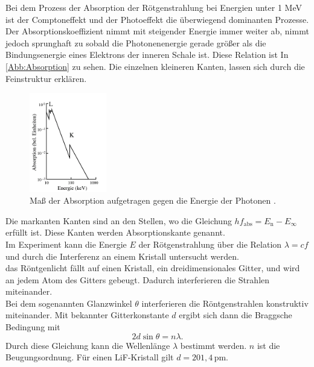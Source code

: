 Bei dem Prozess der Absorption der Rötgenstrahlung bei Energien unter
1 MeV ist der Comptoneffekt und der Photoeffekt die überwiegend dominanten
Prozesse.\\
Der Absorptionskoeffizient nimmt mit steigender Energie immer weiter ab,
nimmt jedoch sprunghaft zu sobald die Photonenenergie gerade größer als die
Bindungsenergie eines Elektrons der inneren Schale ist. Diese Relation ist In
\autoref{Abb:Absorption} zu sehen. Die einzelnen kleineren Kanten, lassen
sich durch die Feinstruktur erklären.\\
\begin{figure}
    \centering
    \includegraphics[width=0.3\textwidth]{Bilder/Absorption.png}
    \caption{Maß der Absorption aufgetragen gegen die Energie der Photonen \cite{sample}.}
    \label{Abb:Absorption}
\end{figure}
Die markanten Kanten sind an den Stellen, wo die Gleichung $h f_{\mathrm{abs}} = E_{\mathrm{n}} - E_{\infty}$
erfüllt ist. Diese Kanten werden Absorptionskante genannt.\\
Im Experiment kann die Energie $E$ der Rötgenstrahlung über die Relation $\lambda = cf$ und
durch die Interferenz an einem Kristall untersucht werden.\\
das Röntgenlicht fällt auf einen Kristall, ein dreidimensionales Gitter,
und wird an jedem Atom des Gitters gebeugt. Dadurch interferieren die 
Strahlen miteinander.\\
Bei dem sogenannten Glanzwinkel $\theta$ interferieren die Röntgenstrahlen konstruktiv
miteinander. Mit bekannter Gitterkonstante $d$ ergibt sich dann die Braggsche Bedingung mit
\begin{equation}
    \label{eqn:bragg}
    2d \sin{\theta} = n \lambda.
\end{equation}
Durch diese Gleichung kann die Wellenlänge $\lambda$ bestimmt werden. $n$ ist 
die Beugungsordnung. Für einen LiF-Kristall gilt $d=201,4 \,\unit{\pico\meter}$.
